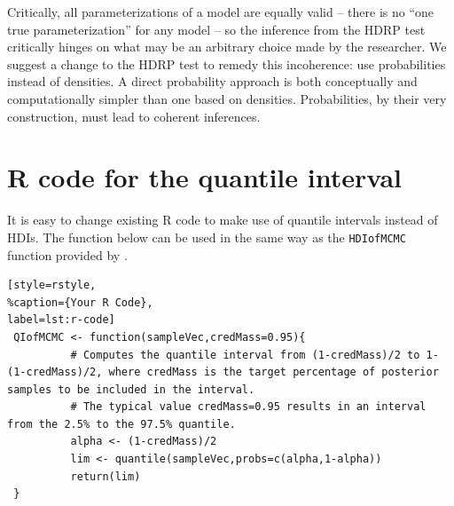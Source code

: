 \documentclass[man]{apa}
\newcommand{\hdr}{HDRP}
\begin{document}
Critically, all parameterizations of a model are equally valid -- there is no ``one true parameterization'' for any model -- so the inference from the \hdr{} test critically hinges on what may be an arbitrary choice made by the researcher. We suggest a change to the \hdr{} test to remedy this incoherence: use probabilities instead of densities. A direct probability approach is both conceptually and computationally simpler than one based on densities. Probabilities, by their very construction, must lead to coherent inferences. 

\null

\newpage
\onecolumn
\appendix
\section{R code for the quantile interval}

It is easy to change existing R code to make use of quantile intervals instead of HDIs.  The function below can be used in the same way as the \texttt{HDIofMCMC} function provided by .

\begin{lstlisting}[style=rstyle, 
%caption={Your R Code}, 
label=lst:r-code]
 QIofMCMC <- function(sampleVec,credMass=0.95){
          # Computes the quantile interval from (1-credMass)/2 to 1-(1-credMass)/2, where credMass is the target percentage of posterior samples to be included in the interval.
          # The typical value credMass=0.95 results in an interval from the 2.5% to the 97.5% quantile.
          alpha <- (1-credMass)/2
          lim <- quantile(sampleVec,probs=c(alpha,1-alpha))
          return(lim)
 }
\end{lstlisting}\null
\end{document}
